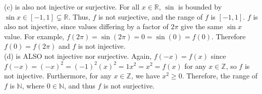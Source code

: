 \documentclass{article}
\theoremstyle{definition}
\begin{document}
(c) is also not injective or surjective. For all \(x\in\mathbb{R} \), \(\sin \) is bounded by \(\sin x\in [-1,1] \subsetneq \mathbb{R} \). Thus, \(f\) is not surjective, and the range of \(f\) is \([-1,1]\). \(f\) is also not injective, since values differing by a factor of \(2\pi \) give the same \(\sin x\) value. For example, \(f(2\pi )=\sin (2\pi )=0=\sin (0)=f(0)\). Therefore \(f(0)=f(2\pi )\) and \(f\) is not injective.\\
(d) is ALSO not injective nor surjective. Again, \(f(-x)=f(x)\) since \(f(-x)=(-x)^2=(-1)^2(x)^2=1x^2=x^2=f(x)\) for any \(x\in\mathbb{Z} \), so \(f\) is not injective. Furthermore, for any \(x\in\mathbb{Z} \), we have \(x^2 \geq 0\). Therefore, the range of \(f\) is \(\mathbb{N}\), where \(0\in\mathbb{N} \), and thus \(f\) is not surjective.
\end{document}
